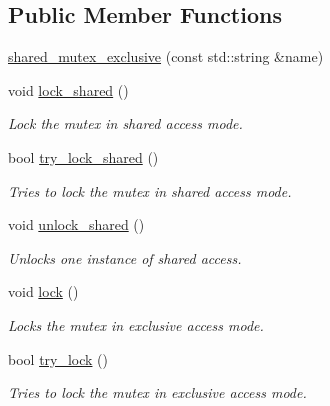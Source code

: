 \subsection*{Public Member Functions}
\begin{DoxyCompactItemize}
\item 
\hyperlink{classcpen333_1_1process_1_1impl_1_1shared__mutex__exclusive_a3acb5fa0c2f3f12200d194d53f7dfad4}{shared\+\_\+mutex\+\_\+exclusive} (const std\+::string \&name)
\item 
void \hyperlink{classcpen333_1_1process_1_1impl_1_1shared__mutex__exclusive_ae512adfb383e28ca05d0e1e84f79a898}{lock\+\_\+shared} ()
\begin{DoxyCompactList}\small\item\em Lock the mutex in shared access mode. \end{DoxyCompactList}\item 
bool \hyperlink{classcpen333_1_1process_1_1impl_1_1shared__mutex__exclusive_a0e2e6a0afb83c06d70ceca86e591732f}{try\+\_\+lock\+\_\+shared} ()
\begin{DoxyCompactList}\small\item\em Tries to lock the mutex in shared access mode. \end{DoxyCompactList}\item 
void \hyperlink{classcpen333_1_1process_1_1impl_1_1shared__mutex__exclusive_a01bc4be0f17231c08d8a06f1341acc81}{unlock\+\_\+shared} ()
\begin{DoxyCompactList}\small\item\em Unlocks one instance of shared access. \end{DoxyCompactList}\item 
void \hyperlink{classcpen333_1_1process_1_1impl_1_1shared__mutex__exclusive_a6b6d61dce0f1a536d24e280c4e7ac9a9}{lock} ()
\begin{DoxyCompactList}\small\item\em Locks the mutex in exclusive access mode. \end{DoxyCompactList}\item 
bool \hyperlink{classcpen333_1_1process_1_1impl_1_1shared__mutex__exclusive_aa7b41d55016b38a9d51f23d8c8468857}{try\+\_\+lock} ()
\begin{DoxyCompactList}\small\item\em Tries to lock the mutex in exclusive access mode. \end{DoxyCompactList}\item 
\mbox{\label{classcpen333_1_1process_1_1impl_1_1shared__mutex__exclusive_ae7f2d10376f1b1fffe20141ec136a721}} 

\end{DoxyCompactItemize}
